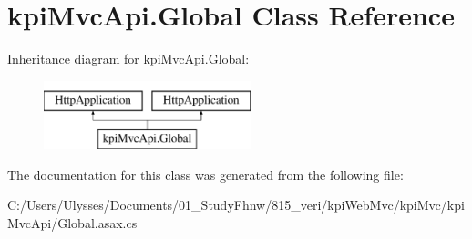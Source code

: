 \hypertarget{classkpi_mvc_api_1_1_global}{}\section{kpi\+Mvc\+Api.\+Global Class Reference}
\label{classkpi_mvc_api_1_1_global}
Inheritance diagram for kpi\+Mvc\+Api.\+Global\+:\begin{figure}[H]
\begin{center}
\leavevmode
\includegraphics[height=2.000000cm]{classkpi_mvc_api_1_1_global}
\end{center}
\end{figure}


The documentation for this class was generated from the following file\+:\begin{DoxyCompactItemize}
\item 
C\+:/\+Users/\+Ulysses/\+Documents/01\+\_\+\+Study\+Fhnw/815\+\_\+veri/kpi\+Web\+Mvc/kpi\+Mvc/kpi\+Mvc\+Api/Global.\+asax.\+cs\end{DoxyCompactItemize}
